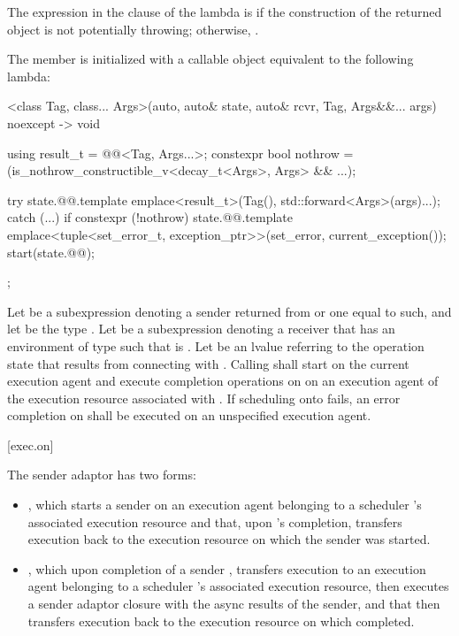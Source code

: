 \pnum
The expression in the  clause of the lambda is 
if the construction of the returned  object
is not potentially throwing;
otherwise, .

\pnum
The member 
is initialized with a callable object equivalent to the following lambda:
\begin{codeblock}
[]<class Tag, class... Args>(auto, auto& state, auto& rcvr, Tag, Args&&... args) noexcept
    -> void {
  using result_t = @@<Tag, Args...>;
  constexpr bool nothrow = (is_nothrow_constructible_v<decay_t<Args>, Args> && ...);

  try {
    state.@@.template emplace<result_t>(Tag(), std::forward<Args>(args)...);
  } catch (...) {
    if constexpr (!nothrow)
      state.@@.template emplace<tuple<set_error_t,
                                                exception_ptr>>(set_error, current_exception());
  }
  start(state.@@);
};
\end{codeblock}

\pnum
Let  be a subexpression denoting
a sender returned from  or one equal to such,
and let  be the type .
Let  be a subexpression denoting a receiver
that has an environment of type 
such that  is .
Let  be an lvalue referring to the operation state
that results from connecting  with .
Calling  shall
start  on the current execution agent and
execute completion operations on 
on an execution agent of the execution resource associated with .
If scheduling onto  fails,
an error completion on  shall be executed
on an unspecified execution agent.

[exec.on]{}

\pnum
The  sender adaptor has two forms:
\begin{itemize}
\item
{},
which starts a sender  on an execution agent
belonging to a scheduler 's associated execution resource and
that, upon 's completion,
transfers execution back to the execution resource
on which the  sender was started.
\item
{},
which upon completion of a sender ,
transfers execution to an execution agent
belonging to a scheduler 's associated execution resource,
then executes a sender adaptor closure 
with the async results of the sender, and
that then transfers execution back to the execution resource
on which  completed.
\end{itemize}

